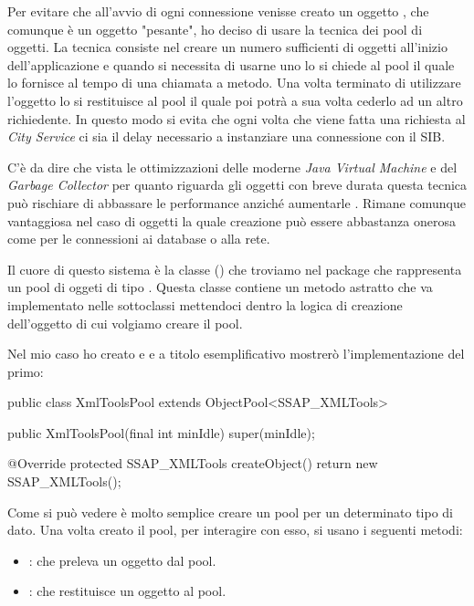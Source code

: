 Per evitare che all'avvio di ogni connessione venisse creato un oggetto , che comunque è un oggetto "pesante", ho deciso di usare la tecnica dei pool di oggetti. La tecnica consiste nel creare un numero sufficienti di oggetti all'inizio dell'applicazione e quando si necessita di usarne uno lo si chiede al pool il quale lo fornisce al tempo di una chiamata a metodo. Una volta terminato di utilizzare l'oggetto lo si restituisce al pool il quale poi potrà a sua volta cederlo ad un altro richiedente.
In questo modo si evita che ogni volta che viene fatta una richiesta al \emph{City Service} ci sia il delay necessario a instanziare una connessione con il SIB.

C'è da dire che vista le ottimizzazioni delle moderne \emph{Java Virtual Machine} e del \emph{Garbage Collector} per quanto riguarda gli oggetti con breve durata questa tecnica può rischiare di abbassare le performance anziché aumentarle \cite{torok2011}. Rimane comunque vantaggiosa nel caso di oggetti la quale creazione può essere abbastanza onerosa come per le connessioni ai database o alla rete.

Il cuore di questo sistema è la classe  (\cite{objectpool}) che troviamo nel package  che rappresenta un pool di oggeti di tipo . Questa classe contiene un metodo astratto  che va implementato nelle sottoclassi mettendoci dentro la logica di creazione dell'oggetto di cui volgiamo creare il pool.

Nel mio caso ho creato  e  e a titolo esemplificativo mostrerò l'implementazione del primo:

\begin{java}[caption={Implementazione di ObjectPool},label={lst:objectPool}]
public class XmlToolsPool extends ObjectPool<SSAP_XMLTools>{
	
	public XmlToolsPool(final int minIdle) {
		super(minIdle);
	}

	@Override
	protected SSAP_XMLTools createObject() {
		return new SSAP_XMLTools();
	}
}
\end{java}

\noindent
Come si può vedere è molto semplice creare un pool per un determinato tipo di dato. Una volta creato il pool, per interagire con esso, si usano i seguenti metodi:

\begin{itemize}
	\item {}: che preleva un oggetto dal pool.
	\item {}: che restituisce un oggetto al pool.
\end{itemize}

